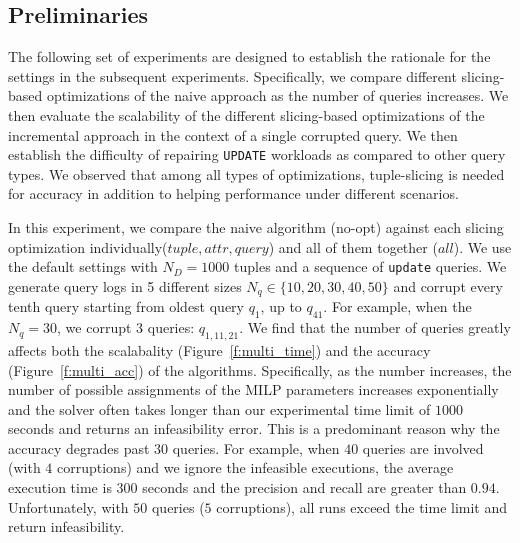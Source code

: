 



\subsection{Preliminaries}
The following set of experiments are designed to establish the rationale for 
the settings in the subsequent experiments.  
Specifically, we compare different slicing-based optimizations of the naive approach
as the number of queries increases.  
We then evaluate the scalability of the different slicing-based optimizations of the 
incremental approach in the context of a single
corrupted query. We then establish the difficulty of repairing \texttt{UPDATE} 
workloads as compared to other query types. 
We observed that among all types of 
optimizations, tuple-slicing is needed for accuracy in addition to helping performance
under different scenarios.


In this experiment, we compare the naive algorithm (no-opt) against 
each slicing optimization individually($tuple, attr, query$) and all of them together ($all$).  
We use the default settings with $N_D = 1000$ tuples and a sequence of \texttt{update} queries.
We generate query logs in 5 different sizes $N_q\in \{10, 20, 30, 40, 50\}$ and corrupt 
every tenth query starting from oldest query $q_1$,
up to $q_{41}$.  For example, when the $N_q = {30}$, we corrupt 3 queries: $q_{1,11,21}$. 
We find that the number of queries greatly affects both the scalabality (Figure~\ref{f:multi_time}) 
and the accuracy (Figure~\ref{f:multi_acc}) of the algorithms. Specifically, as the number increases,
the number of possible assignments of the MILP parameters increases exponentially and the solver often takes
longer than our experimental time limit of $1000$ seconds and returns an infeasibility error.  
This is a predominant reason why the accuracy degrades past $30$ queries.  For example, 
when $40$ queries are involved (with $4$ corruptions) 
and we ignore the infeasible executions, the average execution time is $300$ seconds
and the precision and recall are greater than $0.94$.  Unfortunately, with $50$ queries ($5$ corruptions),
all runs exceed the time limit and return infeasibility.

